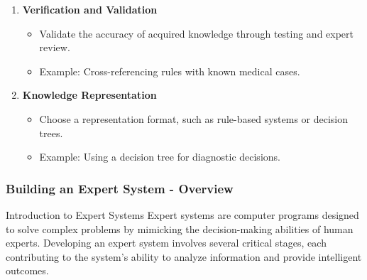 \documentclass[aspectratio=169]{beamer}
\begin{document}
\begin{frame}[fragile]
\begin{enumerate}
        \item \textbf{Verification and Validation}
        \begin{itemize}
            \item Validate the accuracy of acquired knowledge through testing and expert review.
            \item Example: Cross-referencing rules with known medical cases.
        \end{itemize}

        \item \textbf{Knowledge Representation}
        \begin{itemize}
            \item Choose a representation format, such as rule-based systems or decision trees.
            \item Example: Using a decision tree for diagnostic decisions.
        \end{itemize}
    \end{enumerate}
\end{frame}

\begin{frame}[fragile]
    \frametitle{Building an Expert System - Overview}
    \begin{block}{Introduction to Expert Systems}
        Expert systems are computer programs designed to solve complex problems by mimicking the decision-making abilities of human experts. 
        Developing an expert system involves several critical stages, each contributing to the system's ability to analyze information and provide intelligent outcomes.
    \end{block}
\end{frame}
\end{document}
